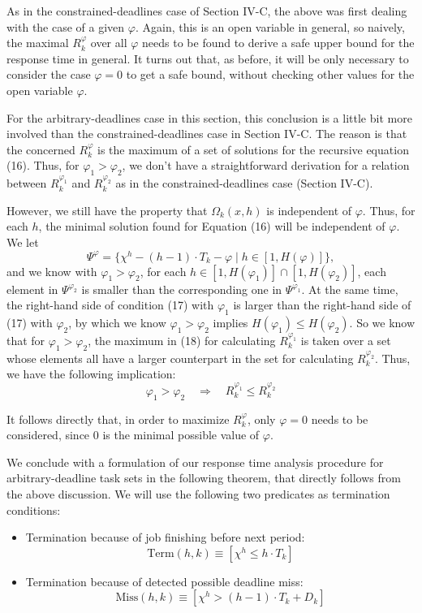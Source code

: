 As in the constrained-deadlines case of Section IV-C, the above was first dealing with the case of a given $\varphi$. Again, this is an open variable in general, so naively, the maximal $R_k^\varphi$ over all $\varphi$ needs to be found to derive a safe upper bound for the response time in general. It turns out that, as before, it will be only necessary to consider the case $\varphi=0$ to get a safe bound, without checking other values for the open variable $\varphi$.

For the arbitrary-deadlines case in this section, this conclusion is a little bit more involved than the constrained-deadlines case in Section IV-C. The reason is that the concerned $R_k^\varphi$ is the maximum of a set of solutions for the recursive equation (16). Thus, for $\varphi_1>\varphi_2$, we don't have a straightforward derivation for a relation between $R_k^{\varphi_1}$ and $R_k^{\varphi_2}$ as in the constrained-deadlines case (Section IV-C).

However, we still have the property that $\Omega_k(x,h)$ is independent of $\varphi$. Thus, for each $h$, the minimal solution found for Equation (16) will be independent of $\varphi$. We let
\[
\Psi^\varphi=\{\chi^h-(h-1)\cdot T_k-\varphi \mid h\in[1,H(\varphi)]\},
\]
and we know with $\varphi_1>\varphi_2$, for each $h\in[1,H(\varphi_1)]\cap[1,H(\varphi_2)]$, each element in $\Psi^{\varphi_2}$ is smaller than the corresponding one in $\Psi^{\varphi_1}$. At the same time, the right-hand side of condition (17) with $\varphi_1$ is larger than the right-hand side of (17) with $\varphi_2$, by which we know $\varphi_1>\varphi_2$ implies $H(\varphi_1)\leq H(\varphi_2)$. So we know that for $\varphi_1>\varphi_2$, the maximum in (18) for calculating $R_k^{\varphi_1}$ is taken over a set whose elements all have a larger counterpart in the set for calculating $R_k^{\varphi_2}$. Thus, we have the following implication:
\[
\varphi_1>\varphi_2
\quad \Rightarrow \quad
R_k^{\varphi_1}\leq R_k^{\varphi_2}
\]

It follows directly that, in order to maximize $R_k^\varphi$, only $\varphi=0$ needs to be considered, since $0$ is the minimal possible value of $\varphi$.

We conclude with a formulation of our response time analysis procedure for arbitrary-deadline task sets in the following theorem, that directly follows from the above discussion. We will use the following two predicates as termination conditions:
\begin{itemize}
    \item Termination because of job finishing before next period:
    \[
    \mathrm{Term}(h,k)\equiv[\chi^h\leq h\cdot T_k]
    \]

    \item Termination because of detected possible deadline miss:
    \[
    \mathrm{Miss}(h,k)\equiv[\chi^h>(h-1)\cdot T_k+D_k]
    \]
\end{itemize}

